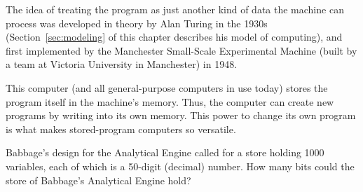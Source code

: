 \begin{schemeregion}
The idea of treating the program as just another kind of data the machine can process was developed in theory by Alan Turing in the 1930s (Section~\ref{sec:modeling} of this chapter describes his model of computing), and first implemented by the Manchester Small-Scale Experimental Machine (built by a team at Victoria University in Manchester) in 1948.  

This computer (and all general-purpose computers in use today) stores the program itself in the machine's memory.  Thus, the computer can create new programs by writing into its own memory.  This power to change its own program is what makes stored-program computers so versatile.



\beforeex
\begin{exercise}
Babbage's design for the Analytical Engine called for a store holding 1000 variables, each of which is a 50-digit (decimal) number.  How many bits could the store of Babbage's Analytical Engine hold? 
\end{exercise}
\afterex
 

\end{schemeregion}
